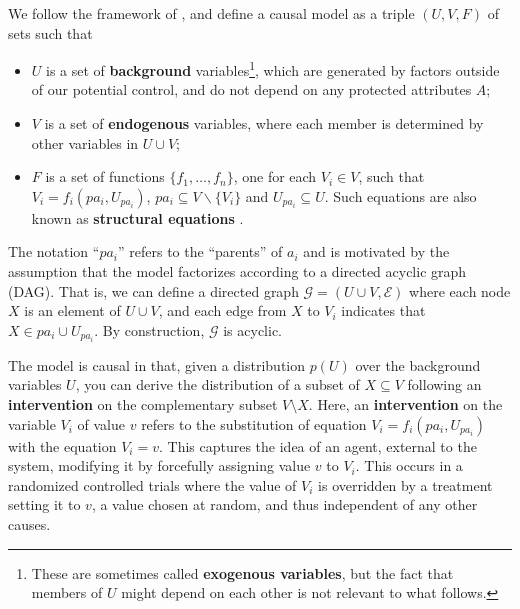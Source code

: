 


\label{subsec:cmc}
We  follow the framework of \citet{pearl:00}, and define a causal
model as a triple $(U, V, F)$ of sets such that
%
\begin{itemize}
\item $U$ is a set of {\bf background} variables\footnote{These are
  sometimes called {\bf exogenous variables}, but the fact that members of $U$
  might depend on each other is not relevant to what follows.}, which are generated by factors
outside of our potential control, and do not depend on any protected attributes $A$;
\item $V$ is a set of {\bf endogenous} variables, where each member is determined by
  other variables in $U \cup V$;
\item $F$ is a set of functions $\{f_1, \dots, f_n\}$, one for each $V_i \in V$, such
that $V_i = f_i(pa_i, U_{pa_i})$, $pa_i \subseteq V \backslash
\{V_i\}$ and $U_{pa_i} \subseteq U$. Such equations are also known as
{\bf structural equations} \citep{bol:89}.
\end{itemize}
%
The notation ``$pa_i$'' refers to the ``parents'' of $a_i$ and is motivated by the assumption that the
model factorizes according to a directed acyclic graph (DAG). That is, we can
define a directed graph ${\mathcal G}=(U \cup V, \mathcal E )$ where each node $X$ is an
element of $U \cup V$, and each edge from $X$ to $V_i$ indicates that $X \in pa_i \cup U_{pa_i}$. By construction, $\mathcal G$ is
acyclic.

The model is causal in that, given a distribution $p(U)$
over the background variables $U$, you can derive the distribution of
a subset of $X\subseteq V$ following an {\bf intervention} on the
complementary subset $V\setminus X$.  Here,
an {\bf intervention} on the variable $V_i$ of value $v$ refers to the substitution of
equation $V_i = f_i(pa_i, U_{pa_i})$ with the equation $V_i =
v$. This captures the idea of an agent, external to the
system, modifying it by forcefully assigning value $v$ to $V_i$. This occurs in a randomized controlled trials where the value
of $V_i$ is overridden by a treatment setting it to $v$, a value
chosen at random, and thus independent of any other causes.%

